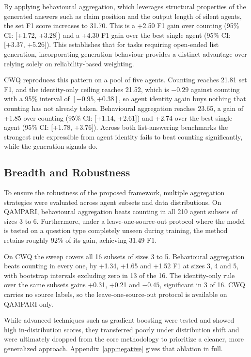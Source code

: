 \documentclass[11pt]{article}
\begin{document}
By applying behavioural aggregation, which leverages structural properties of the generated answers such as claim position and the output length of silent agents, the set F1 score increases to 31.70. This is a +2.50 F1 gain over counting (95\% CI: [+1.72, +3.28]) and a +4.30 F1 gain over the best single agent (95\% CI: [+3.37, +5.26]). This establishes that for tasks requiring open-ended list generation, incorporating generation behaviour provides a distinct advantage over relying solely on reliability-based weighting.

CWQ reproduces this pattern on a pool of five agents. Counting reaches 21.81 set F1, and the identity-only ceiling reaches 21.52, which is $-0.29$ against counting with a 95\% interval of $[-0.95, +0.38]$, so agent identity again buys nothing that counting has not already taken. Behavioural aggregation reaches 23.65, a gain of +1.85 over counting (95\% CI: [+1.14, +2.61]) and +2.74 over the best single agent (95\% CI: [+1.78, +3.76]). Across both list-answering benchmarks the strongest rule expressible from agent identity fails to beat counting significantly, while the generation signals do.


\subsection{Breadth and Robustness}
\label{sec:breadth}
\label{sec:robust}

To ensure the robustness of the proposed framework, multiple aggregation strategies were evaluated across agent subsets and data distributions. On QAMPARI, behavioural aggregation beats counting in all 210 agent subsets of sizes 3 to 6. Furthermore, under a leave-one-source-out protocol where the model is tested on a question type completely unseen during training, the method retains roughly 92\% of its gain, achieving 31.49 F1.

On CWQ the sweep covers all 16 subsets of sizes 3 to 5. Behavioural aggregation beats counting in every one, by +1.34, +1.65 and +1.52 F1 at sizes 3, 4 and 5, with bootstrap intervals excluding zero in 13 of the 16. The identity-only rule over the same subsets gains +0.31, +0.21 and $-0.45$, significant in 3 of 16. CWQ carries no source labels, so the leave-one-source-out protocol is available on QAMPARI only.

While advanced techniques such as gradient boosting were tested and showed high in-distribution scores, they transferred poorly under distribution shift and were ultimately dropped from the core methodology to prioritize a cleaner, more generalized approach. Appendix~\ref{app:negative} gives that ablation in full.
\end{document}
